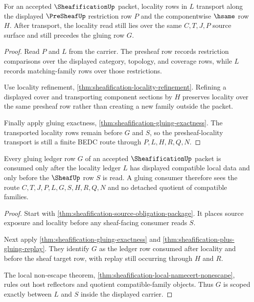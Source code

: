 \begin{theorem}
\label{thm:sheafification-presheaf-locality-transport}
For an accepted $\SheafificationUp$ packet, locality rows in $L$ transport along the displayed $\PreSheafUp$ restriction row $P$ and the componentwise $\hsame$ row $H$. After transport, the locality read still lies over the same $C,T,J,P$ source surface and still precedes the gluing row $G$.
\end{theorem}
\begin{proof}
Read $P$ and $L$ from the carrier. The presheaf row records restriction comparisons over the displayed category, topology, and coverage rows, while $L$ records matching-family rows over those restrictions.

Use locality refinement, \autoref{thm:sheafification-locality-refinement}. Refining a displayed cover and transporting component sections by $H$ preserves locality over the same presheaf row rather than creating a new family outside the packet.

Finally apply gluing exactness, \autoref{thm:sheafification-gluing-exactness}. The transported locality rows remain before $G$ and $S$, so the presheaf-locality transport is still a finite BEDC route through $P,L,H,R,Q,N$.
\end{proof}

\begin{theorem}
\label{thm:sheafification-gluing-ledger-scope}
Every gluing ledger row $G$ of an accepted $\SheafificationUp$ packet is consumed only after the locality ledger $L$ has displayed compatible local data and only before the $\SheafUp$ row $S$ is read. A gluing consumer therefore sees the route $C,T,J,P,L,G,S,H,R,Q,N$ and no detached quotient of compatible families.
\end{theorem}
\begin{proof}
Start with \autoref{thm:sheafification-source-obligation-package}. It places source exposure and locality before any sheaf-facing consumer reads $S$.

Next apply \autoref{thm:sheafification-gluing-exactness} and \autoref{thm:sheafification-plus-gluing-replay}. They identify $G$ as the ledger row consumed after locality and before the sheaf target row, with replay still occurring through $H$ and $R$.

The local non-escape theorem, \autoref{thm:sheafification-local-namecert-nonescape}, rules out host reflectors and quotient compatible-family objects. Thus $G$ is scoped exactly between $L$ and $S$ inside the displayed carrier.
\end{proof}

